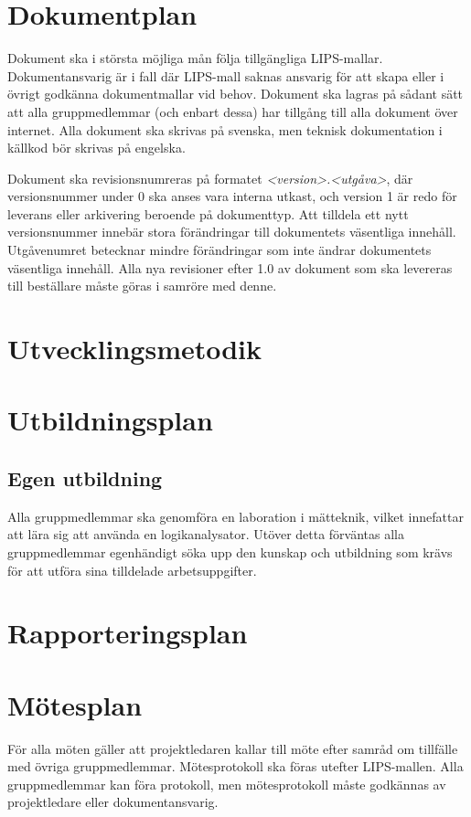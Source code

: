 \documentclass[a4paper,11pt]{article}
\begin{document}
\section{Dokumentplan}
Dokument ska i största möjliga mån följa tillgängliga LIPS-mallar. Dokumentansvarig är i fall där LIPS-mall saknas ansvarig för att skapa eller i övrigt godkänna dokumentmallar vid behov. Dokument ska lagras på sådant sätt att alla gruppmedlemmar (och enbart dessa) har tillgång till alla dokument över internet. Alla dokument ska skrivas på svenska, men teknisk dokumentation i källkod bör skrivas på engelska. 

Dokument ska revisionsnumreras på formatet \textit{\textless version\textgreater .\textless utgåva\textgreater}, där versionsnummer under 0 ska anses vara interna utkast, och version 1 är redo för leverans eller arkivering beroende på dokumenttyp. Att tilldela ett nytt versionsnummer innebär stora förändringar till dokumentets väsentliga innehåll. Utgåvenumret betecknar mindre förändringar som inte ändrar dokumentets väsentliga innehåll. Alla nya revisioner efter 1.0 av dokument som ska levereras till beställare måste göras i samröre med denne.

\section{Utvecklingsmetodik}

\section{Utbildningsplan}
\subsection{Egen utbildning}
Alla gruppmedlemmar ska genomföra en laboration i mätteknik, vilket innefattar att lära sig att använda en logikanalysator. Utöver detta förväntas alla gruppmedlemmar egenhändigt söka upp den kunskap och utbildning som krävs för att utföra sina tilldelade arbetsuppgifter.

\section{Rapporteringsplan}

\section{Mötesplan}
För alla möten gäller att projektledaren kallar till möte efter samråd om tillfälle med övriga gruppmedlemmar. Mötesprotokoll ska föras utefter LIPS-mallen. Alla gruppmedlemmar kan föra protokoll, men mötesprotokoll måste godkännas av projektledare eller dokumentansvarig.
\end{document}
